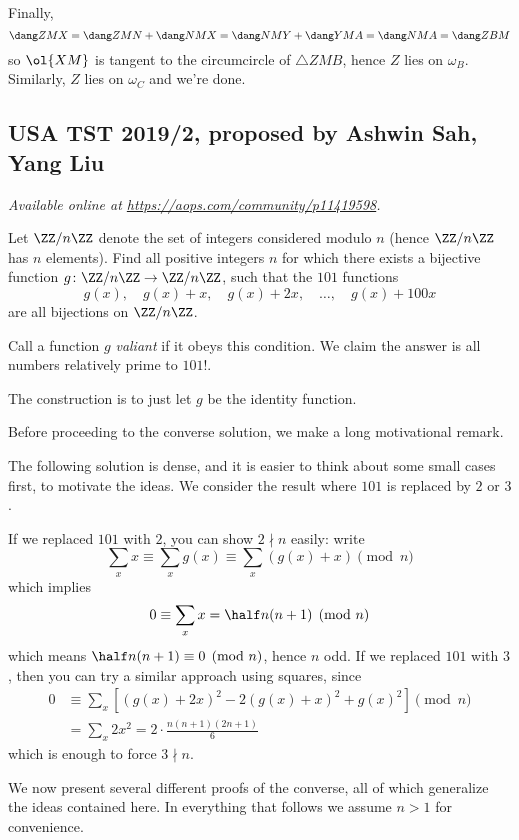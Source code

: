 \documentclass[11pt]{scrartcl}
\begin{document}
Finally, \[ \dang ZMX=\dang ZMN+\dang NMX=\dang NMY+\dang YMA
  = \dang NMA=\dang ZBM \]
so $\ol{XM}$ is tangent to the circumcircle of
$\triangle ZMB$, hence $Z$ lies on $\omega_B$.
Similarly, $Z$ lies on $\omega_C$ and we're done.
\pagebreak

\subsection{USA TST 2019/2, proposed by Ashwin Sah, Yang Liu}
\textsl{Available online at \url{https://aops.com/community/p11419598}.}
\begin{mdframed}[style=mdpurplebox,frametitle={Problem statement}]
Let $\ZZ/n\ZZ$ denote the set of integers considered modulo $n$
(hence $\ZZ/n\ZZ$ has $n$ elements).
Find all positive integers $n$ for which there exists a bijective function
$g \colon \ZZ/n\ZZ \to \ZZ/n\ZZ$,
such that the $101$ functions
\[ g(x), \quad g(x)+x, \quad g(x)+2x, \quad \dots, \quad g(x)+100x \]
are all bijections on $\ZZ/n\ZZ$.
\end{mdframed}
Call a function $g$ \emph{valiant} if it obeys this condition.
We claim the answer is all numbers relatively prime to $101!$.

The construction is to just let $g$ be the identity function.

Before proceeding to the converse solution,
we make a long motivational remark.
\begin{remark*}
  The following solution is dense,
  and it is easier to think about some small cases first,
  to motivate the ideas.
  We consider the result
  where $101$ is replaced by $2$ or $3$.
  \begin{itemize}
    \ii If we replaced $101$ with $2$,
    you can show $2 \nmid n$ easily: write
    \[ \sum_x x \equiv \sum_x g(x) \equiv \sum_x (g(x) + x ) \pmod n \]
    which implies
    \[ 0 \equiv \sum_x x = \half n (n+1) \pmod n \]
    which means $\half n(n+1) \equiv 0 \pmod n$, hence $n$ odd.
    \ii If we replaced $101$ with $3$,
    then you can try a similar approach using squares, since
    \begin{align*}
      0 &\equiv \sum_x \left[ \left( g(x)+2x \right)^2
      - 2\left( g(x)+x \right)^2
      + g(x)^2 \right] \pmod n\\
      &= \sum_x 2x^2 = 2 \cdot \frac{n(n+1)(2n+1)}{6}
    \end{align*}
    which is enough to force $3 \nmid n$.
  \end{itemize}
\end{remark*}
We now present several different proofs of the converse,
all of which generalize the ideas contained here.
In everything that follows we assume $n > 1$ for convenience.
\end{document}
